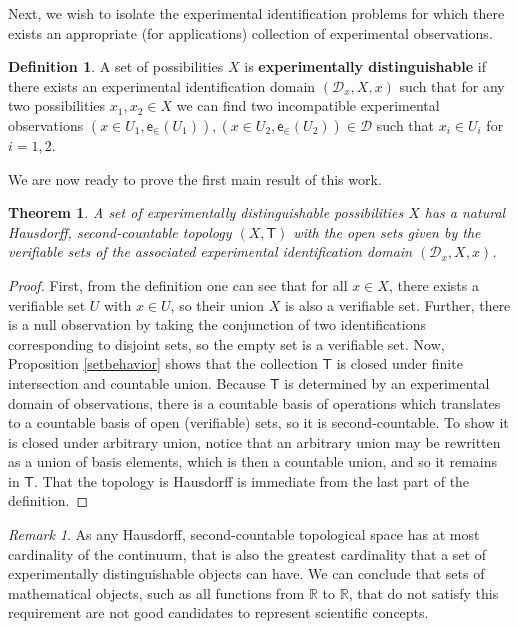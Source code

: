 \documentclass[review]{elsarticle}
\theoremstyle{plain}%
\newtheorem{thm}{Theorem}[section]
\theoremstyle{definition}
\newtheorem{defn}{Definition}[section]
\theoremstyle{remark}
\newtheorem*{rem}{Remark}
\begin{document}
Next, we wish to isolate the experimental identification problems for which there exists an appropriate (for applications) collection of experimental observations. 

\begin{defn}
A set of possibilities $X$ is \textbf{experimentally distinguishable} if there exists an experimental identification domain $(\mathcal{D}_x, X, x)$ such that for any two possibilities $x_1, x_2 \in X$ we can find two incompatible experimental observations $(x\in U_1, \mathsf{e}_\in(U_1)), (x\in U_2, \mathsf{e}_\in(U_2))\in\mathcal{D}$ such that $x_i\in U_i$ for $i=1,2$. 
\end{defn}

We are now ready to prove the first main result of this work.

\begin{thm}
A set of experimentally distinguishable possibilities $X$ has a natural Hausdorff, second-countable topology $(X,\mathsf{T})$ with the open sets given by the verifiable sets of the associated experimental identification domain $(\mathcal{D}_x, X, x)$.
\end{thm}
\begin{proof}
First, from the definition one can see that for all $x\in X$, there exists a verifiable set $U$ with $x\in U$, so their union $X$ is also a verifiable set. Further, there is a null observation by taking the conjunction of two identifications corresponding to disjoint sets, so the empty set is a verifiable set. Now, Proposition \ref{setbehavior} shows that the collection $\mathsf{T}$ is closed under finite intersection and countable union. Because $\mathsf{T}$ is determined by an experimental domain of observations, there is a countable basis of operations which translates to a countable basis of open (verifiable) sets, so it is second-countable. To show it is closed under arbitrary union, notice that an arbitrary union may be rewritten as a union of basis elements, which is then a countable union, and so it remains in $\mathsf{T}$. That the topology is Hausdorff is immediate from the last part of the definition. 
\end{proof}

\begin{rem}
As any Hausdorff, second-countable topological space has at most cardinality of the continuum, that is also the greatest cardinality that a set of experimentally distinguishable objects can have. We can conclude that sets of mathematical objects, such as all functions from $\mathbb{R}$ to $\mathbb{R}$, that do not satisfy this requirement are not good candidates to represent scientific concepts.
\end{rem}
\end{document}
